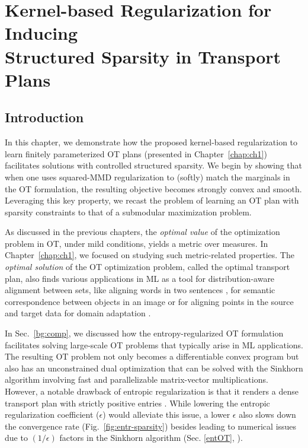 \chapter[Kernel-based Regularization for\\ Inducing Structured Sparsity in Transport Plans]{Kernel-based Regularization for Inducing \\Structured Sparsity in Transport Plans}
\label{chap:ch2}
\section{Introduction}\label{sec:sot-intro}
In this chapter, we demonstrate how the proposed kernel-based regularization to learn finitely parameterized OT plans (presented in Chapter~\ref{chap:ch1}) facilitates solutions with controlled structured sparsity.
We begin by showing that when one uses squared-MMD regularization to (softly) match the marginals in the OT formulation, the resulting objective becomes strongly convex and smooth. Leveraging this key property, we recast the problem of learning an OT plan with sparsity constraints to that of a submodular maximization problem.

As discussed in the previous chapters, the \textit{optimal value} of the optimization problem in OT, under mild conditions, yields a metric over measures. In Chapter~\ref{chap:ch1}, we focused on studying such metric-related properties. The \textit{optimal solution} of the OT optimization problem, called the optimal transport plan, also finds various applications in ML as a tool for distribution-aware alignment between sets, like aligning words in two sentences \citep{arase-etal-2023-unbalanced}, for semantic correspondence between objects in an image \citep{liu2020semantic} or for aligning points in the source and target data for domain adaptation \citep{Courty17domAda}.

In Sec.~\ref{bg:comp}, we discussed how the entropy-regularized OT formulation
\citep{cuturi13a} facilitates solving large-scale OT problems that typically arise in ML applications. The resulting OT problem not only becomes a differentiable convex program but also has an unconstrained dual optimization that can be solved with the Sinkhorn algorithm involving fast and parallelizable matrix-vector multiplications. 
However, a notable drawback of entropic regularization is that it renders a dense transport plan with strictly positive entries \citep{blondel18a,liu2023sparsityconstrained}. While lowering the entropic regularization coefficient ($\epsilon$) would alleviate this issue, a lower $\epsilon$ also slows down the convergence rate (Fig.~\ref{fig:entr-sparsity}) besides leading to numerical issues due to $(1/\epsilon)$ factors in the Sinkhorn algorithm (Sec. \ref{entOT}, \citep[Remark (4.7)]{peyre2019computational}).


